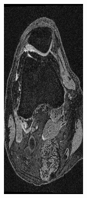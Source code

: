 \documentclass[a4paper,12pt]{article}
\begin{document}
\begin{figure}[H]
    \centering
    \begin{subfigure}[t]{0.4\linewidth}
    \includegraphics[width=\linewidth]{original_3.png}

\end{subfigure}
\end{figure}
\end{document}
